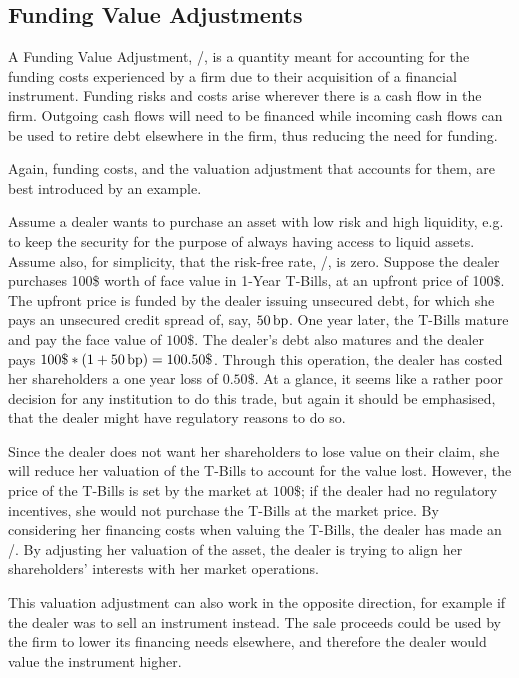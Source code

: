 \documentclass[main.tex]{subfiles}
\begin{document}
    \subsection{Funding Value Adjustments}
        A Funding Value Adjustment, \FVA/, is a quantity meant for accounting for the funding costs 
        experienced by a firm due to their acquisition of a financial instrument.
        Funding risks and costs arise wherever there is a cash flow in the firm. 
        Outgoing cash flows will need to be financed while incoming cash flows
        can be used to retire debt elsewhere in the firm, thus reducing the need for funding.

        Again, funding costs, and the valuation adjustment that accounts for them,
        are best introduced by an example.

        \begin{example}
        Assume a dealer wants to purchase an asset with low risk and high liquidity, 
        e.g. to keep the security for the purpose of always having access to liquid assets.
        Assume also, for simplicity, that the risk-free rate, \OIS/, is zero.
        Suppose the dealer purchases 100\$ worth of face value in 1-Year T-Bills,
        at an upfront price of 100\$. 
        The upfront price is funded by the dealer issuing unsecured debt, 
        for which she pays an unsecured credit spread of, say, $50\,\text{bp}$.
        One year later, the T-Bills mature and pay the face value of $100\$$.
        The dealer's debt also matures and the dealer pays $100\$ * (1 + 50\basispoint) = 100.50\$$.
        Through this operation, the dealer has costed her shareholders a one year loss of $0.50\$$.
        At a glance, it seems like a rather poor decision for any institution to do this trade,
        but again it should be emphasised, that the dealer might have regulatory reasons to do so.

        Since the dealer does not want her shareholders to lose value on their claim,
        she will reduce her valuation of the T-Bills to account for the value lost.
        However, the price of the T-Bills is set by the market at $100\$$;
        if the dealer had no regulatory incentives, 
        she would not purchase the T-Bills at the market price. 
        By considering her financing costs when valuing the T-Bills, 
        the dealer has made an \FVA/.
        By adjusting her valuation of the asset, 
        the dealer is trying to align her shareholders' interests with her market operations.
        
        This valuation adjustment can also work in the opposite direction, 
        for example if the dealer was to sell an instrument instead.
        The sale proceeds could be used by the firm to lower its financing needs elsewhere,
        and therefore the dealer would value the instrument higher. 
        \end{example}
        
\end{document}
